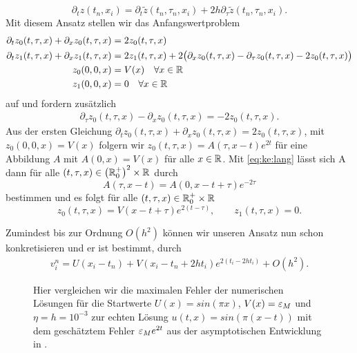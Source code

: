 \[ \partial_t z(t_n, x_i) = \partial_t \tilde z(t_n, \tau_n, x_i) + 2 h \partial_\tau \tilde z(t_n, \tau_n, x_i). \]
Mit diesem Ansatz stellen wir das Anfangswertproblem
\begin{align*}
\partial_t z_0(t,\tau,x) + \partial_x z_0(t,\tau,x) &= 2 z_0(t,\tau,x)\\
\partial_t z_1(t,\tau,x) + \partial_x z_1(t,\tau,x) &= 2 z_1(t,\tau,x) + 2 \bigl( \partial_x z_0(t,\tau,x) - \partial_\tau z_0(t,\tau,x) - 2z_0(t,\tau,x) \bigr)\\
z_0(0,0,x) &= V(x) \quad \forall x \in \mathbb R\\
z_1(0,0,x) &= 0  \quad \forall x \in \mathbb R
\end{align*}
auf und fordern zusätzlich
\begin{align}\label{eq:ke:lang}
\partial_\tau z_0(t,\tau,x) - \partial_x z_0(t, \tau, x) = -2z_0(t,\tau,x).
\end{align}
Aus der ersten Gleichung $\partial_t z_0(t,\tau,x) + \partial_x z_0(t,\tau,x) = 2 z_0(t,\tau,x)$, mit $z_0(0,0,x) = V(x)$ folgern wir
$z_0(t, \tau, x) = A(\tau, x - t) e^{2t}$ für eine Abbildung $A$ mit $A(0, x) = V(x)$ für alle $x \in \mathbb R$.
Mit \eqref{eq:ke:lang} lässt sich A dann für alle $(t, \tau, x) \in \left(\mathbb R^+_0\right)^2 \times \mathbb R$ durch
\[ A(\tau, x - t) = A(0, x - t + \tau) e^{- 2\tau} \]
bestimmen und es folgt für alle $(t, \tau, x) \in \mathbb R^+_0 \times \mathbb R$
\[ z_0(t, \tau, x) = V(x - t + \tau) e^{2 (t - \tau)}, \qquad z_1(t, \tau, x) = 0. \]


Zumindest bis zur Ordnung $O(h^2)$ können wir unseren Ansatz nun schon konkretisieren und er ist bestimmt, durch
\begin{align}\label{eq:ke:loesung}
v^n_i = U(x_i - t_n) + V(x_i - t_n + 2 h t_i) e^{2 (t_i - 2 h t_i)} + O(h^2).
\end{align}

\begin{figure}
\centering
{}
\caption{Hier vergleichen wir die maximalen Fehler der numerischen Lösungen für die Startwerte $U(x) = sin(\pi x)$, $V(x) = \varepsilon_M$ und $\eta = h = 10^{-3}$ zur echten Lösung $u(t,x) = sin(\pi(x - t))$ mit dem geschätztem Fehler $\varepsilon_M e^{2t}$ aus der asymptotischen Entwicklung in .}
\label{fig:transport:kleineta:max_error}
\end{figure}

